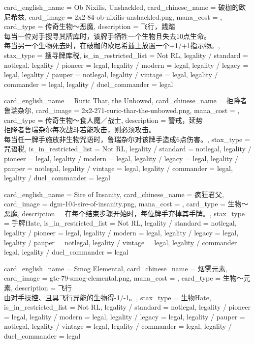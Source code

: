 \documentclass[lang = cn, color = black, 10pt]{AllThatStax}
\begin{document}
\card
{
	card_english_name = {Ob Nixilis, Unshackled},
	card_chinese_name = {破枷的欧尼希兹},
	card_image = 2x2-84-ob-nixilis-unshackled.png,
	mana_cost = ,
	card_type = 传奇生物～恶魔,
	description = {飞行，践踏\\
每当一位对手搜寻其牌库时，该牌手牺牲一个生物且失去10点生命。\\
每当另一个生物死去时，在破枷的欧尼希兹上放置一个+1/+1指示物。},
	stax_type = 搜寻牌库税,
	is_in_restricted_list = Not RL,
	legality / standard = notlegal,
	legality / pioneer = legal,
	legality / modern = legal,
	legality / legacy = legal,
	legality / pauper = notlegal,
	legality / vintage = legal,
	legality / commander = legal,
	legality / duel_commander = legal
}

\card
{
	card_english_name = {Ruric Thar, the Unbowed},
	card_chinese_name = {拒降者鲁瑞杂尔},
	card_image = 2x2-271-ruric-thar-the-unbowed.png,
	mana_cost = ,
	card_type = 传奇生物～食人魔／战士,
	description = {警戒，延势\\
拒降者鲁瑞杂尔每次战斗若能攻击，则必须攻击。\\
每当任一牌手施放非生物咒语时，鲁瑞杂尔对该牌手造成6点伤害。},
	stax_type = 咒语税,
	is_in_restricted_list = Not RL,
	legality / standard = notlegal,
	legality / pioneer = legal,
	legality / modern = legal,
	legality / legacy = legal,
	legality / pauper = notlegal,
	legality / vintage = legal,
	legality / commander = legal,
	legality / duel_commander = legal
}

\card
{
	card_english_name = {Sire of Insanity},
	card_chinese_name = {疯狂君父},
	card_image = dgm-104-sire-of-insanity.png,
	mana_cost = ,
	card_type = 生物～恶魔,
	description = {在每个结束步骤开始时，每位牌手弃掉其手牌。},
	stax_type = 手牌Hate,
	is_in_restricted_list = Not RL,
	legality / standard = notlegal,
	legality / pioneer = legal,
	legality / modern = legal,
	legality / legacy = legal,
	legality / pauper = notlegal,
	legality / vintage = legal,
	legality / commander = legal,
	legality / duel_commander = legal
}

\card
{
	card_english_name = {Smog Elemental},
	card_chinese_name = {烟雾元素},
	card_image = gtc-79-smog-elemental.png,
	mana_cost = ,
	card_type = 生物～元素,
	description = {飞行\\
由对手操控、且具飞行异能的生物得-1/-1。},
	stax_type = 生物Hate,
	is_in_restricted_list = Not RL,
	legality / standard = notlegal,
	legality / pioneer = legal,
	legality / modern = legal,
	legality / legacy = legal,
	legality / pauper = notlegal,
	legality / vintage = legal,
	legality / commander = legal,
	legality / duel_commander = legal
}
\end{document}
